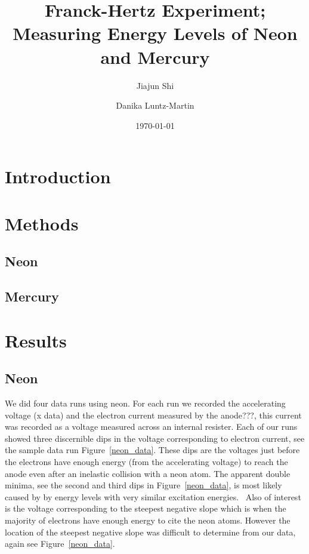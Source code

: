 \documentclass[prb,preprint]{revtex4-1}
\begin{document}
\title{Franck-Hertz Experiment; Measuring Energy Levels of Neon and Mercury}

\author{Jiajun Shi}


\author{Danika Luntz-Martin}


\date{\today}

\begin{abstract}


\end{abstract}


\maketitle 


\section{Introduction} 


\section{Methods}

\subsection{Neon}
\subsection{Mercury}


\section{Results}

\subsection{Neon}

We did four data runs using neon. For each run we recorded the accelerating voltage (x data) and the electron current measured by the anode???, this current was recorded as a voltage measured across an internal resister. Each of our runs showed three discernible dips in the voltage corresponding to electron current, see the sample data run Figure~\ref{neon_data}. These dips are the voltages just before the electrons have enough energy (from the accelerating voltage) to reach the anode even after an inelastic collision with a neon atom. The apparent double minima, see the second and third dips in Figure~\ref{neon_data}, is most likely caused by by energy levels with very similar excitation energies.~\cite{newfeatures} Also of interest is the voltage corresponding to the steepest negative slope which is when the majority of electrons have enough energy to cite the neon atoms. However the location of the steepest negative slope was difficult to determine from our data, again see Figure~\ref{neon_data}.
\end{document}
